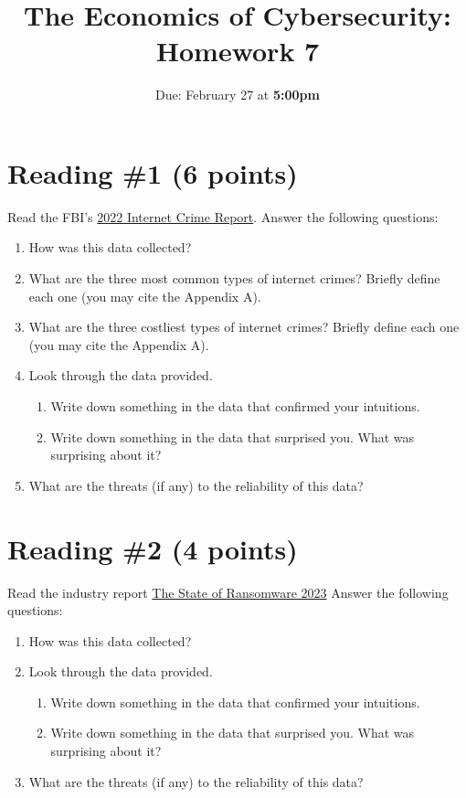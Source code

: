 \documentclass[11pt]{article}
\title{The Economics of Cybersecurity: Homework 7}
\date{Due: February 27 at {\bf 5:00pm}}
\author{}
\begin{document}
\maketitle

\section*{Reading \#1 (6 points)}

Read the FBI's \href{https://www.ic3.gov/Media/PDF/AnnualReport/2022_IC3Report.pdf}{2022 Internet Crime Report}. 
Answer the following questions:
\begin{enumerate}
    \item How was this data collected?
    \item What are the three most common types of internet crimes? Briefly define each one (you may cite the Appendix A).
    \item What are the three costliest types of internet crimes? Briefly define each one (you may cite the Appendix A).
    \item Look through the data provided.
    \begin{enumerate}
        \item Write down something in the data that confirmed your intuitions.
        \item Write down something in the data that surprised you. What was surprising about it?
    \end{enumerate}
    \item What are the threats (if any) to the reliability of this data?
\end{enumerate}


\section*{Reading \#2 (4 points)}

Read the industry report \href{https://assets.sophos.com/X24WTUEQ/at/c949g7693gsnjh9rb9gr8/sophos-state-of-ransomware-2023-wp.pdf}{The State of Ransomware 2023}
Answer the following questions:
\begin{enumerate}
    \item How was this data collected?
    \item Look through the data provided.
    \begin{enumerate}
        \item Write down something in the data that confirmed your intuitions.
        \item Write down something in the data that surprised you. What was surprising about it?
    \end{enumerate}
    \item What are the threats (if any) to the reliability of this data?
\end{enumerate}
\end{document}

